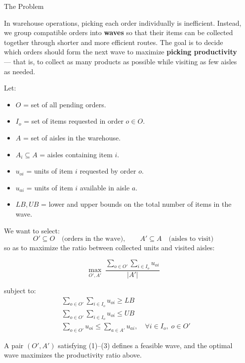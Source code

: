 \documentclass[final]{beamer}
\newlength{\sepwidth}
\newlength{\colwidth}
\newcommand{\separatorcolumn}{\begin{column}{\sepwidth}\end{column}}
\begin{document}
\begin{frame}[t]
\begin{columns}[t]
\separatorcolumn

\begin{column}{\colwidth}

  \begin{block}{The Problem}

    In warehouse operations, picking each order individually is inefficient. Instead, we group compatible orders into \textbf{waves} so that their items can be collected together through shorter and more efficient routes. The goal is to decide which orders should form the next wave to maximize \textbf{picking productivity} — that is, to collect as many products as possible while visiting as few aisles as needed.

    Let:
\begin{itemize}
    \item $O$ = set of all pending orders.
    \item $I_o$ = set of items requested in order $o \in O$.
    \item $A$ = set of aisles in the warehouse.
    \item $A_i \subseteq A$ = aisles containing item $i$.
    \item $u_{oi}$ = units of item $i$ requested by order $o$.
    \item $u_{ai}$ = units of item $i$ available in aisle $a$.
    \item $LB, UB$ = lower and upper bounds on the total number of items in the wave.
\end{itemize}

We want to select:
\[
O' \subseteq O \quad \text{(orders in the wave)}, \qquad
A' \subseteq A \quad \text{(aisles to visit)}
\]
so as to maximize the ratio between collected units and visited aisles:

\[
\max_{O',A'} \; \frac{\displaystyle\sum_{o \in O'} \sum_{i \in I_o} u_{oi}}{|A'|}
\]

subject to:
\begin{align}
    &\sum_{o \in O'} \sum_{i \in I_o} u_{oi} \ge LB \tag{1}\\[3pt]
    &\sum_{o \in O'} \sum_{i \in I_o} u_{oi} \le UB \tag{2}\\[3pt]
    &\sum_{o \in O'} u_{oi} \le \sum_{a \in A'} u_{ai}, \quad \forall i \in I_o, \; o \in O' \tag{3}
\end{align}

A pair $(O',A')$ satisfying (1)--(3) defines a feasible wave, and the optimal wave maximizes the productivity ratio above.
  \end{block}


\end{column}
\end{columns}
\end{frame}
\end{document}
